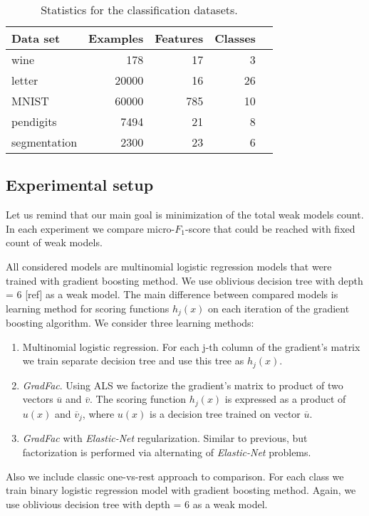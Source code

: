 \documentclass{article}
\begin{document}
\begin{table}[t]
\caption{Statistics for the classification datasets.}
\label{datasets}
\vskip 0.15in
\begin{center}
\begin{small}
\begin{sc}
\begin{tabular}{lrrrr}
\hline
\abovespace\belowspace
Data set & Examples & Features & Classes \\
\hline
\abovespace
wine     		& 178 	& 17 	& 3     \\
letter    		& 20000 & 16 	& 26 	\\
MNIST     		& 60000 & 785 	& 10    \\
pendigits 		& 7494 	& 21 	& 8 	\\
segmentation    & 2300 	& 23 	& 6     \\
\hline
\end{tabular}
\end{sc}
\end{small}
\end{center}
\vskip -0.1in
\end{table}
 
\subsection{Experimental setup}
Let us remind that our main goal is minimization of the total weak models count. In each experiment we compare micro-$F_1$-score that could be reached with fixed count of weak models. 

All considered models are multinomial logistic regression models that were trained with gradient boosting method. We use oblivious decision tree with depth = 6 [ref] as a weak model. The main difference between compared models is learning method for scoring functions $h_{j}(x)$ on each iteration of the gradient boosting algorithm. We consider three learning methods:
\begin{enumerate}
	\item Multinomial logistic regression. For each j-th column of the gradient's matrix we train separate decision tree and use this tree as $h_{j}(x)$.

	\item \emph{GradFac}. Using ALS we factorize the gradient's matrix to product of two vectors $\overline{u}$ and $\overline{v}$. The scoring function $h_{j}(x)$ is expressed as a product of $u(x)$ and $\overline{v}_{j}$, where $u(x)$ is a decision tree trained on vector $\overline{u}$.

	\item \emph{GradFac} with \emph{Elastic-Net} regularization. Similar to previous, but factorization is performed via alternating of \emph{Elastic-Net} problems.
\end{enumerate}
Also we include classic one-vs-rest approach to comparison. For each class we train binary logistic regression model with gradient boosting method. Again, we use oblivious decision tree with depth = 6 as a  weak model.
\end{document}
